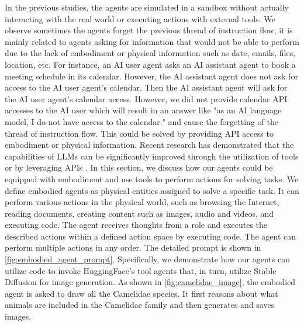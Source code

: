 In the previous studies, the agents are simulated in a sandbox without actually interacting with the real world or executing actions with external tools. We observe sometimes the agents forget the previous thread of instruction flow, it is mainly related to agents asking for information that would not be able to perform due to the lack of embodiment or physical information such as date, emails, files, location, etc. For instance, an AI user agent asks an AI assistant agent to book a meeting schedule in its calendar. However, the AI assistant agent does not ask for access to the AI user agent's calendar. Then the AI assistant agent will ask for the AI user agent's calendar access. However, we did not provide calendar API accesses to the AI user which will result in an answer like "as an AI language model, I do not have access to the calendar." and cause the forgetting of the thread of instruction flow. This could be solved by providing API access to embodiment or physical information. Recent research has demonstrated that the capabilities of LLMs can be significantly improved through the utilization of tools or by leveraging APIs \cite{schick2023toolformer,langchain,openai_plugins,wolf-etal-2020-transformers,zhou2023webarena}. In this section, we discuss how our agents could be equipped with embodiment and use tools to perform actions for solving tasks. We define embodied agents as physical entities assigned to solve a specific task. It can perform various actions in the physical world, such as browsing the Internet, reading documents, creating content such as images, audio and videos, and executing code. The agent receives thoughts from a role and executes the described actions within a defined action space by executing code. The agent can perform multiple actions in any order. The detailed prompt is shown in \figLabel \ref{fig:embodied_agent_prompt}. Specifically, we demonstrate how our agents can utilize code to invoke HuggingFace's tool agents \cite{wolf-etal-2020-transformers} that, in turn, utilize Stable Diffusion \cite{rombach2021highresolution} for image generation. As shown in \figLabel \ref{fig:camelidae_image}, the embodied agent is asked to draw all the Camelidae species. It first reasons about what animals are included in the Camelidae family and then generates and saves images.

